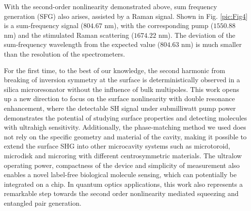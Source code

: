 \documentclass[a4paper,8pt,hyperref, twocolumn]{article}
\begin{document}

With the second-order nonlinearity demonstrated above, sum frequency generation (SFG) also arises, assisted by a Raman signal. 
Shown in Fig. \ref{pic:Fig4} is a sum-frequency signal ($804.67$ nm), with the corresponding pump ($1550.88$ nm) and the stimulated Raman scattering ($1674.22$ nm).%
The deviation of the sum-frequency wavelength from the expected value ($804.63$ nm) is much smaller than the resolution of the spectrometers.

For the first time, to the best of our knowledge, the second harmonic from breaking of inversion symmetry at the surface  is deterministically observed in a silica microresonator without the influence of bulk multipoles. 
This work opens up a new direction to focus on the surface nonlinearity with double resonance enhancement, where the detectable SH signal under submilliwatt pump power demonstrates the potential of studying surface properties and detecting molecules with ultrahigh sensitivity. 
Additionally, the phase-matching method we used does not rely on the specific geometry and material of the cavity, making it possible to extend the surface SHG into other microcavity systems such as microtoroid, microdisk and microring with different centrosymmetric materials.
The ultralow operating power, compactness of the device and simplicity of measurement also enables a novel label-free biological molecule sensing, which can potentially be integrated on a chip. 
In quantum optics applications, this work also represents a remarkable step towards the second order nonlinearity mediated squeezing and entangled pair generation.
 





\end{document}
